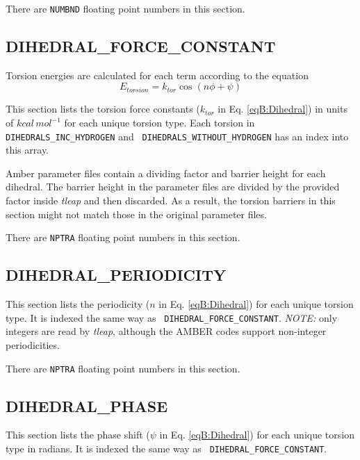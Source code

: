 
\noindent There are {\tt NUMBND} floating point numbers in this section.

\subsection*{DIHEDRAL\_FORCE\_CONSTANT}

Torsion energies are calculated for each term according to the equation
\begin{equation}
   E_{torsion} = k_{tor} \cos \left ( n \phi + \psi \right )
   \label{eqB:Dihedral}
\end{equation}

This section lists the torsion force constants ($k_{tor}$ in Eq.
\ref{eqB:Dihedral}) in units of $kcal\, mol^{-1}$ for each unique torsion type.
Each torsion in {\tt DIHEDRALS\_INC\_HYDROGEN} and {\tt
DIHEDRALS\_WITHOUT\_HYDROGEN} has an index into this array.

Amber parameter files contain a dividing factor and barrier height for each
dihedral. The barrier height in the parameter files are divided by the provided
factor inside \emph{tleap} and then discarded. As a result, the torsion barriers
in this section might not match those in the original parameter files.


\noindent There are {\tt NPTRA} floating point numbers in this section.

\subsection*{DIHEDRAL\_PERIODICITY}

This section lists the periodicity ($n$ in Eq. \ref{eqB:Dihedral}) for each
unique torsion type. It is indexed the same way as {\tt
DIHEDRAL\_FORCE\_CONSTANT}. \emph{NOTE:} only integers are read by
\emph{tleap}, although the AMBER codes support non-integer periodicities.


\noindent There are {\tt NPTRA} floating point numbers in this section.

\subsection*{DIHEDRAL\_PHASE}

This section lists the phase shift ($\psi$ in Eq. \ref{eqB:Dihedral}) for each
unique torsion type in radians. It is indexed the same way as {\tt
DIHEDRAL\_FORCE\_CONSTANT}.

